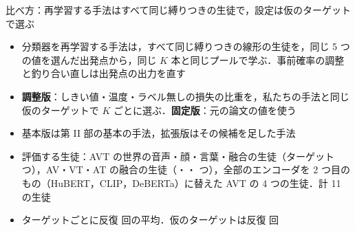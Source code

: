 \begin{frame}{比べ方：再学習する手法はすべて同じ縛りつきの生徒で，設定は仮のターゲットで選ぶ}
  \vspace{0.3em}
  \begin{itemize}\footnotesize\setlength{\itemsep}{7pt}
    \item 分類器を再学習する手法は，すべて同じ縛りつきの線形の生徒を，同じ 5 つの値を選んだ出発点から，同じ $K$ 本と同じプールで学ぶ．事前確率の調整と釣り合い直しは出発点の出力を直す
    \item \textbf{調整版}：しきい値・温度・ラベル無しの損失の比重を，私たちの手法と同じ仮のターゲットで $K$ ごとに選ぶ．\textbf{固定版}：元の論文の値を使う
    \item 基本版は第 II 部の基本の手法，拡張版はその候補を足した手法
    \item 評価する生徒：AVT の世界の音声・顔・言葉・融合の生徒（ターゲット  つ），AV・VT・AT の融合の生徒（・・ つ），全部のエンコーダを 2 つ目のもの（HuBERT，CLIP，DeBERTa）に替えた AVT の 4 つの生徒．計 11 の生徒
    \item ターゲットごとに反復  回の平均．仮のターゲットは反復  回
  \end{itemize}
\end{frame}

